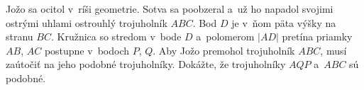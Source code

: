 \createTaskHeader
Jožo sa ocitol v~ríši geometrie. Sotva sa poobzeral a~už ho napadol svojimi ostrými uhlami ostrouhlý
trojuholník $ABC$. Bod $D$ je v~ňom päta výšky na stranu $BC$. Kružnica so stredom v~bode $D$ a~polomerom $|AD|$
pretína priamky $AB$, $AC$ postupne v~bodoch $P$, $Q$. Aby Jožo premohol trojuholník $ABC$, musí zaútočiť
na jeho podobné trojuholníky. Dokážte, že trojuholníky $AQP$ a~$ABC$ sú podobné.
